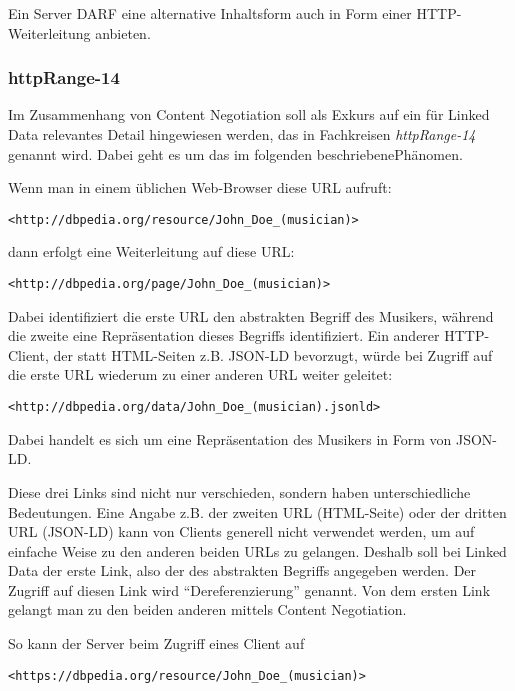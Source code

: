 \documentclass[,a4paper]{article}
\begin{document}
Ein Server DARF eine alternative Inhaltsform auch in Form einer
HTTP-Weiterleitung anbieten.

\subsubsection{httpRange-14}\label{httprange-14}

Im Zusammenhang von Content Negotiation soll als Exkurs auf ein für
Linked Data relevantes Detail hingewiesen werden, das in Fachkreisen
\emph{httpRange-14} genannt wird. Dabei geht es um das im folgenden
beschriebenePhänomen.

Wenn man in einem üblichen Web-Browser diese URL aufruft:

\begin{verbatim}
<http://dbpedia.org/resource/John_Doe_(musician)>
\end{verbatim}

dann erfolgt eine Weiterleitung auf diese URL:

\begin{verbatim}
<http://dbpedia.org/page/John_Doe_(musician)>
\end{verbatim}

Dabei identifiziert die erste URL den abstrakten Begriff des Musikers,
während die zweite eine Repräsentation dieses Begriffs identifiziert.
Ein anderer HTTP-Client, der statt HTML-Seiten z.B. JSON-LD bevorzugt,
würde bei Zugriff auf die erste URL wiederum zu einer anderen URL weiter
geleitet:

\begin{verbatim}
<http://dbpedia.org/data/John_Doe_(musician).jsonld>
\end{verbatim}

Dabei handelt es sich um eine Repräsentation des Musikers in Form von
JSON-LD.

Diese drei Links sind nicht nur verschieden, sondern haben
unterschiedliche Bedeutungen. Eine Angabe z.B. der zweiten URL
(HTML-Seite) oder der dritten URL (JSON-LD) kann von Clients generell
nicht verwendet werden, um auf einfache Weise zu den anderen beiden URLs
zu gelangen. Deshalb soll bei Linked Data der erste Link, also der des
abstrakten Begriffs angegeben werden. Der Zugriff auf diesen Link wird
``Dereferenzierung'' genannt. Von dem ersten Link gelangt man zu den
beiden anderen mittels Content Negotiation.

So kann der Server beim Zugriff eines Client auf

\begin{verbatim}
<https://dbpedia.org/resource/John_Doe_(musician)>
\end{verbatim}
\end{document}
